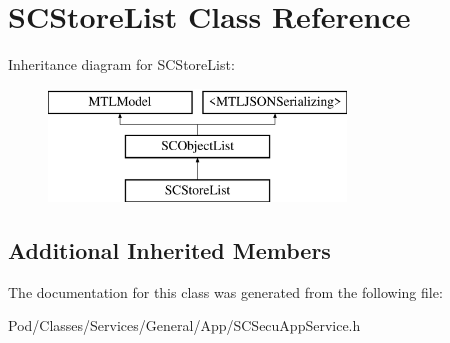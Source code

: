 \hypertarget{interface_s_c_store_list}{}\section{S\+C\+Store\+List Class Reference}
\label{interface_s_c_store_list}
Inheritance diagram for S\+C\+Store\+List\+:\begin{figure}[H]
\begin{center}
\leavevmode
\includegraphics[height=3.000000cm]{interface_s_c_store_list}
\end{center}
\end{figure}
\subsection*{Additional Inherited Members}


The documentation for this class was generated from the following file\+:\begin{DoxyCompactItemize}
\item 
Pod/\+Classes/\+Services/\+General/\+App/S\+C\+Secu\+App\+Service.\+h\end{DoxyCompactItemize}
